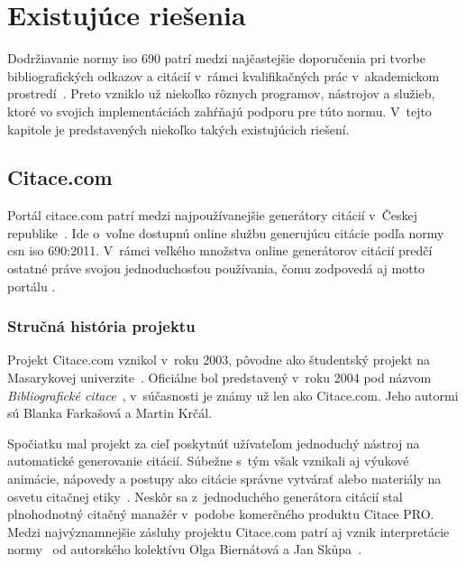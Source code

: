 \documentclass[
  color,
  table,
  nolof,
  oneside,
]{fithesis3}
\begin{document}


\chapter{Existujúce riešenia}\label{ch:facilities:iso690}

Dodržiavanie normy \gls{iso} 690 patrí medzi najčastejšie doporučenia pri tvorbe bibliografických odkazov a citácií v~rámci kvalifikačných prác v~akademickom prostredí~\cite{Kratochvil2011}. Preto vzniklo už niekoľko rôznych programov, nástrojov a služieb, ktoré vo svojich implementáciách zahŕňajú podporu pre túto normu. V~tejto kapitole je predstavených niekoľko takých existujúcich riešení.

\section{Citace.com}

Portál citace.com patrí medzi najpoužívanejšie generátory citácií v~Českej republike~\cite{Krcal2014}. Ide o~voľne dostupnú online službu generujúcu citácie podľa normy \gls{csn} \gls{iso} 690:2011. V~rámci veľkého množstva online generátorov citácií predčí ostatné práve svojou jednoduchosťou používania, čomu zodpovedá aj motto portálu .

\subsection{Stručná história projektu}

Projekt Citace.com vznikol v~roku 2003, pôvodne ako študentský projekt na Masarykovej univerzite~\cite{Krcal2004:sdruk}. Oficiálne bol predstavený v~roku 2004 pod názvom \emph{Bibliografické citace}~\cite{Krcal2004}, v~súčasnosti je známy už len ako Citace.com. Jeho autormi sú Blanka Farkašová a Martin Krčál.

Spočiatku mal projekt za cieľ poskytnúť užívateľom jednoduchý nástroj na automatické generovanie citácií. Súbežne s~tým však vznikali aj výukové animácie, nápovedy a postupy ako citácie správne vytvárať alebo materiály na osvetu citačnej etiky~\cite{Krcal2004:sdruk}. Neskôr sa z~jednoduchého generátora citácií stal plnohodnotný citačný manažér v~podobe komerčného produktu Citace PRO. Medzi najvýznamnejšie zásluhy projektu Citace.com patrí aj vznik interpretácie normy~\cite{Krcal2012} od autorského kolektívu Olga Biernátová a Jan Sk\r{u}pa~\cite{Biernatova2011}.
\end{document}

